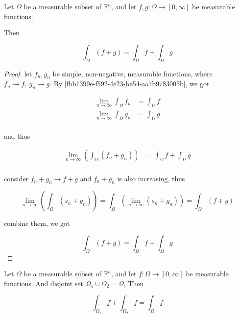 \begin{thm}
    \label{a1203caa-2e3d-4549-b385-8acd12b2d13f}
    Let $\Omega$ be a measurable subset of $\mathbb{R}^n$, and let $f,g: \Omega \to [0, \infty]$  be measurable functions.  
    
    Then

    \[
        \int_{\Omega} \left( f + g \right) = \int_{\Omega}  f + \int_{\Omega}  g
    \]
\end{thm}

\begin{proof}
    let $f_n, g_n$ be simple, non-negative, measurable functions, where $f_n \to f, \: g_n \to g$. By 
    \autoref{fbb1399e-f592-4e23-be54-aa7b9783005b}, we got

    \begin{align*}
        \lim_{n \to \infty}\int_{\Omega} f_n &= \int_{\Omega} f \\
        \lim_{n \to \infty}\int_{\Omega} g_n &= \int_{\Omega} g \\
    \end{align*}

    and thus


    \begin{align*}
        \lim_{n \to \infty}\left(\int_{\Omega} (f_n + g_n) \right) &= \int_{\Omega} f + \int_{\Omega} g\\
    \end{align*}

    consider $f_n + g_n \to f + g$ and $f_n + g_n$ is also increasing, thus

    \[
        \lim_{n \to \infty}\left(\int_{\Omega} (s_n + g_n) \right) = \int_{\Omega} \left(\lim_{n \to \infty}(s_n + g_n) \right) = \int_{\Omega}(f+g)
    \]

    combine them, we got

    \[
        \int_{\Omega} \left( f + g \right) = \int_{\Omega}  f + \int_{\Omega}  g
    \]
\end{proof}

\begin{thm}
    Let $\Omega$ be a measurable subset of $\mathbb{R}^n$, and let $f: \Omega \to [0, \infty]$  be measurable functions. 
    And disjoint set $\Omega_1 \cup \Omega_2 = \Omega$, Then

    \[
        \int_{\Omega_1} f + \int_{\Omega_2}f = \int_{\Omega}f
    \]

\end{thm}

